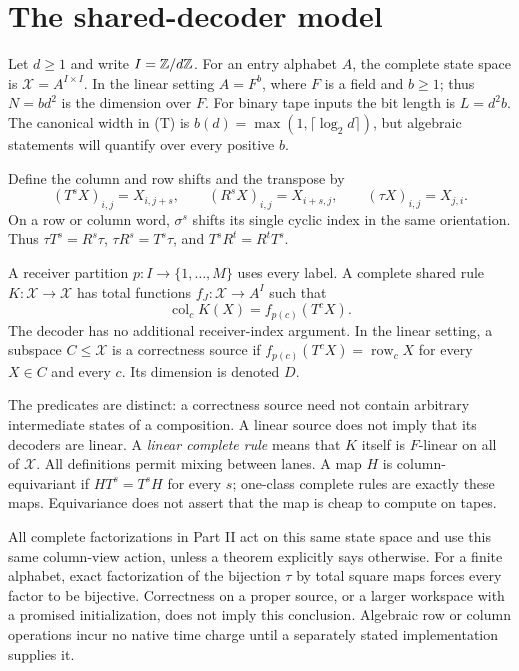\section{The shared-decoder model}\label{sec:model}
Let $d\ge1$ and write $I=\mathbb{Z}/d\mathbb{Z}$. For an entry alphabet $A$, the complete
state space is $\mathcal X=A^{I\times I}$. In the linear setting $A=F^b$,
where $F$ is a field and $b\ge1$; thus $N=bd^2$ is the dimension over $F$.
For binary tape inputs the bit length is $L=d^2b$. The canonical width in
\textup{(T)} is $b(d)=\max(1,\lceil\log_2d\rceil)$, but algebraic statements
will quantify over every positive $b$.

Define the column and row shifts and the transpose by
\[
 (T^sX)_{i,j}=X_{i,j+s},\qquad
 (R^sX)_{i,j}=X_{i+s,j},\qquad
 (\tau X)_{i,j}=X_{j,i}.
\]
On a row or column word, $\sigma^s$ shifts its single cyclic index in the same
orientation. Thus $\tau T^s=R^s\tau$, $\tau R^s=T^s\tau$, and $T^sR^t=R^tT^s$.

\begin{definition}\label{def:shared-rule}
A receiver partition $p:I\to\{1,\ldots,M\}$ uses every label.
A complete shared rule $K:\mathcal X\to\mathcal X$ has total functions
$f_J:\mathcal X\to A^I$ such that
\[
 \operatorname{col}_c K(X)=f_{p(c)}(T^cX).
\]
The decoder has no additional receiver-index argument. In the linear setting,
a subspace $C\le\mathcal X$ is a correctness source if
$f_{p(c)}(T^cX)=\operatorname{row}_cX$ for every $X\in C$ and every $c$.
Its dimension is denoted $D$.
\end{definition}

The predicates are distinct: a correctness source need not contain arbitrary
intermediate states of a composition. A linear source does not imply that its
decoders are linear. A \emph{linear complete rule} means that $K$ itself is
$F$-linear on all of $\mathcal X$. All definitions permit mixing between lanes.
A map $H$ is column-equivariant if $HT^s=T^sH$ for every $s$; one-class
complete rules are exactly these maps. Equivariance does not assert that the
map is cheap to compute on tapes.

All complete factorizations in Part II act on this same state space and use
this same column-view action, unless a theorem explicitly says otherwise.
For a finite alphabet, exact factorization of the bijection $\tau$ by total
square maps forces every factor to be bijective. Correctness on a proper
source, or a larger workspace with a promised initialization, does not imply
this conclusion. Algebraic row or column operations incur no native time
charge until a separately stated implementation supplies it.
